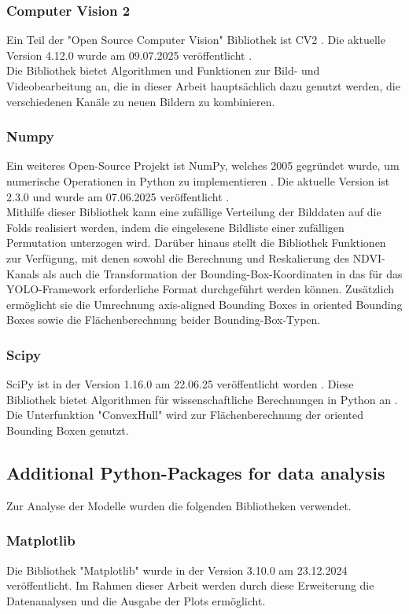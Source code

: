 \subsubsection{Computer Vision 2}
Ein Teil der "Open Source Computer Vision" Bibliothek ist \Acrfull{CV2} \cite{opencv_about}. Die aktuelle Version 4.12.0 wurde am 09.07.2025 veröffentlicht \cite{opencv_release}. \\
Die Bibliothek bietet Algorithmen und Funktionen zur Bild- und Videobearbeitung an, die in dieser Arbeit hauptsächlich dazu genutzt werden, die verschiedenen Kanäle zu neuen Bildern zu kombinieren.
\subsubsection{Numpy}
Ein weiteres Open-Source Projekt ist NumPy, welches 2005 gegründet wurde, um numerische Operationen in Python zu implementieren \cite{numpy_about}. Die aktuelle Version ist 2.3.0 und wurde am 07.06.2025 veröffentlicht \cite{numpy_main_web}. \\
Mithilfe dieser Bibliothek kann eine zufällige Verteilung der Bilddaten auf die Folds realisiert werden, indem die eingelesene Bildliste einer zufälligen Permutation unterzogen wird. Darüber hinaus stellt die Bibliothek Funktionen zur Verfügung, mit denen sowohl die Berechnung und Reskalierung des \acrshort{NDVI}-Kanals als auch die Transformation der Bounding-Box-Koordinaten in das für das \acrshort{YOLO}-Framework erforderliche Format durchgeführt werden können. Zusätzlich ermöglicht sie die Umrechnung axis-aligned Bounding Boxes in oriented Bounding Boxes sowie die Flächenberechnung beider Bounding-Box-Typen.
\subsubsection{Scipy}
SciPy ist in der Version 1.16.0 am 22.06.25 veröffentlicht worden \cite{scipy-main}. Diese Bibliothek bietet Algorithmen für wissenschaftliche Berechnungen in Python an \cite{scipy-main}. Die Unterfunktion "ConvexHull" wird zur Flächenberechnung der oriented Bounding Boxen genutzt.
\subsection{Additional Python-Packages for data analysis}
Zur Analyse der Modelle wurden die folgenden Bibliotheken verwendet.
\subsubsection*{Matplotlib}
Die Bibliothek "Matplotlib" wurde in der Version 3.10.0 am 23.12.2024 veröffentlicht\cite{matplotlib}. Im Rahmen dieser Arbeit werden durch diese Erweiterung die Datenanalysen und die Ausgabe der Plots ermöglicht.
